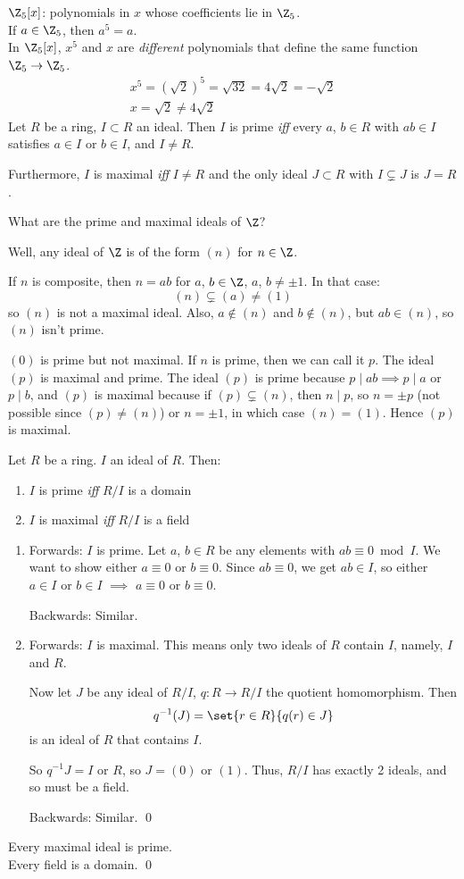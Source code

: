 $\Z_5[x]$: polynomials in $x$ whose coefficients lie in $\Z_5$. \\
\fact If $a\in\Z_5$, then $a^5=a$. \\
\fact In $\Z_5[x]$, $x^5$ and $x$ are \emph{different} polynomials that define the same function $\Z_5\to\Z_5$.
\begin{gather*}
x^5 = (\sqrt2)^5 = \sqrt{32} = 4\sqrt2 = -\sqrt2 \\
x = \sqrt2 \neq 4\sqrt2
\end{gather*}
 Let $R$ be a ring, $I\subset R$ an ideal.  Then $I$ is prime \emph{iff} every $a$, $b\in R$ with $ab\in I$ satisfies $a\in I$ or $b\in I$, and $I\neq R$.

Furthermore, $I$ is maximal \emph{iff} $I\neq R$ and the only ideal $J\subset R$ with $I\subsetneq J$ is $J=R$.

\eg What are the prime and maximal ideals of $\Z$?

Well, any ideal of $\Z$ is of the form $(n)$ for $n\in\Z$.

If $n$ is composite, then $n=ab$ for $a$, $b\in\Z$, $a$, $b\neq\pm1$.  In that case:
\[ (n) \subsetneq (a) \neq (1) \]
so $(n)$ is not a maximal ideal.  Also, $a\notin(n)$ and $b\notin(n)$, but $ab\in(n)$, so $(n)$ isn't prime.

$(0)$ is prime but not maximal.  If $n$ is prime, then we can call it $p$.  The ideal $(p)$ is maximal and prime.  The ideal $(p)$ is prime because $p\mid ab\implies p\mid a$ or $p\mid b$, and $(p)$ is maximal because if $(p)\subsetneq(n)$, then $n\mid p$, so $n=\pm p$ (not possible since $(p)\neq(n)$) or $n=\pm1$, in which case $(n)=(1)$.  Hence $(p)$ is maximal.

\thm Let $R$ be a ring.  $I$ an ideal of $R$.  Then:
\begin{enumerate}[label=(\arabic*)]
\item $I$ is prime \emph{iff} $R/I$ is a domain
\item $I$ is maximal \emph{iff} $R/I$ is a field
\end{enumerate}
\pf \begin{enumerate}[label=(\arabic*)]
\item Forwards: $I$ is prime.  Let $a$, $b\in R$ be any elements with $ab\equiv0\bmod I$.  We want to show either $a\equiv0$ or $b\equiv0$.  Since $ab\equiv0$, we get $ab\in I$, so either $a\in I$ or $b\in I$ $\implies$ $a\equiv0$ or $b\equiv0$.

Backwards: Similar.
\item Forwards:  $I$ is maximal.  This means only two ideals of $R$ contain $I$, namely, $I$ and $R$.

Now let $J$ be any ideal of $R/I$, $q\colon R\to R/I$ the quotient homomorphism.  Then
\[ q^{-1}(J) = \set{r\in R}{q(r)\in J} \]
is an ideal of $R$ that contains $I$.

So $q^{-1}J=I$ or $R$, so $J=(0)$ or $(1)$.  Thus, $R/I$ has exactly 2 ideals, and so must be a field.

Backwards: Similar. \qed
\end{enumerate}
\cor Every maximal ideal is prime. \\
\pf Every field is a domain. \qed

